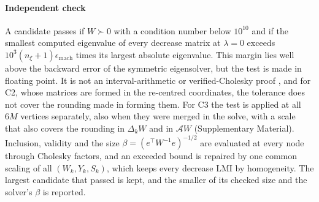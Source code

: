 \paragraph{Independent check}
A candidate passes if $W\succ0$ with a condition number below $10^{10}$ and if the smallest computed eigenvalue of every decrease matrix at $\lambda=0$ exceeds $10^3(n_\xi+1)\epsilon_{\mathrm{mach}}$ times its largest absolute eigenvalue. This margin lies well above the backward error of the symmetric eigensolver, but the test is made in floating point. It is not an interval-arithmetic or verified-Cholesky proof \citep{rump2006verification}, and for C2, whose matrices are formed in the re-centred coordinates, the tolerance does not cover the rounding made in forming them. For C3 the test is applied at all $6M$ vertices separately, also when they were merged in the solve, with a scale that also covers the rounding in $\Delta_kW$ and in $\mathcal AW$ (Supplementary Material). Inclusion, validity and the size $\beta=(e^\top W^{-1}e)^{-1/2}$ are evaluated at every node through Cholesky factors, and an exceeded bound is repaired by one common scaling of all $(W_k,Y_k,S_k)$, which keeps every decrease LMI by homogeneity. The largest candidate that passed is kept, and the smaller of its checked size and the solver's $\beta$ is reported.

